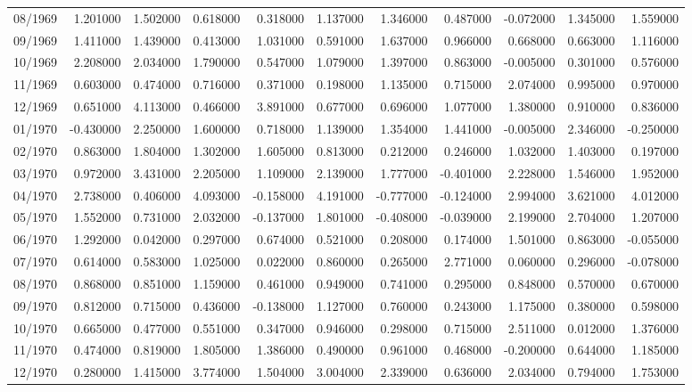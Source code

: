 \begin{tabular}{lrrrrrrrrrr}
08/1969 & 1.201000 & 1.502000 & 0.618000 & 0.318000 & 1.137000 & 1.346000 & 0.487000 & -0.072000 & 1.345000 & 1.559000 \\
09/1969 & 1.411000 & 1.439000 & 0.413000 & 1.031000 & 0.591000 & 1.637000 & 0.966000 & 0.668000 & 0.663000 & 1.116000 \\
10/1969 & 2.208000 & 2.034000 & 1.790000 & 0.547000 & 1.079000 & 1.397000 & 0.863000 & -0.005000 & 0.301000 & 0.576000 \\
11/1969 & 0.603000 & 0.474000 & 0.716000 & 0.371000 & 0.198000 & 1.135000 & 0.715000 & 2.074000 & 0.995000 & 0.970000 \\
12/1969 & 0.651000 & 4.113000 & 0.466000 & 3.891000 & 0.677000 & 0.696000 & 1.077000 & 1.380000 & 0.910000 & 0.836000 \\
01/1970 & -0.430000 & 2.250000 & 1.600000 & 0.718000 & 1.139000 & 1.354000 & 1.441000 & -0.005000 & 2.346000 & -0.250000 \\
02/1970 & 0.863000 & 1.804000 & 1.302000 & 1.605000 & 0.813000 & 0.212000 & 0.246000 & 1.032000 & 1.403000 & 0.197000 \\
03/1970 & 0.972000 & 3.431000 & 2.205000 & 1.109000 & 2.139000 & 1.777000 & -0.401000 & 2.228000 & 1.546000 & 1.952000 \\
04/1970 & 2.738000 & 0.406000 & 4.093000 & -0.158000 & 4.191000 & -0.777000 & -0.124000 & 2.994000 & 3.621000 & 4.012000 \\
05/1970 & 1.552000 & 0.731000 & 2.032000 & -0.137000 & 1.801000 & -0.408000 & -0.039000 & 2.199000 & 2.704000 & 1.207000 \\
06/1970 & 1.292000 & 0.042000 & 0.297000 & 0.674000 & 0.521000 & 0.208000 & 0.174000 & 1.501000 & 0.863000 & -0.055000 \\
07/1970 & 0.614000 & 0.583000 & 1.025000 & 0.022000 & 0.860000 & 0.265000 & 2.771000 & 0.060000 & 0.296000 & -0.078000 \\
08/1970 & 0.868000 & 0.851000 & 1.159000 & 0.461000 & 0.949000 & 0.741000 & 0.295000 & 0.848000 & 0.570000 & 0.670000 \\
09/1970 & 0.812000 & 0.715000 & 0.436000 & -0.138000 & 1.127000 & 0.760000 & 0.243000 & 1.175000 & 0.380000 & 0.598000 \\
10/1970 & 0.665000 & 0.477000 & 0.551000 & 0.347000 & 0.946000 & 0.298000 & 0.715000 & 2.511000 & 0.012000 & 1.376000 \\
11/1970 & 0.474000 & 0.819000 & 1.805000 & 1.386000 & 0.490000 & 0.961000 & 0.468000 & -0.200000 & 0.644000 & 1.185000 \\
12/1970 & 0.280000 & 1.415000 & 3.774000 & 1.504000 & 3.004000 & 2.339000 & 0.636000 & 2.034000 & 0.794000 & 1.753000 \\

\end{tabular}
